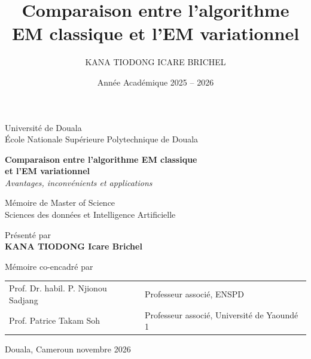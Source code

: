 \documentclass[12pt,a4paper,oneside]{report}
\title{Comparaison entre l'algorithme EM classique et l'EM variationnel}
\author{KANA TIODONG ICARE BRICHEL}
\date{Année Académique 2025 -- 2026}
\theoremstyle{plain}
\theoremstyle{definition}
\numberwithin{equation}{chapter}
\begin{document}
\addto\captionsfrench{%
  \renewcommand{\tablename}{Tableau}%
  \renewcommand{\figurename}{Figure}%
  \renewcommand{\contentsname}{Table des matières}%
  \renewcommand{\listtablename}{Liste des tableaux}%
  \renewcommand{\listfigurename}{Table des figures}%
  \renewcommand{\bibname}{Bibliographie}%
}
\captionsfrench

\begin{titlepage}
\begin{center}
{\Large Université de Douala}\\[4pt]
{\large École Nationale Supérieure Polytechnique de Douala}

\vspace{2.5cm}
{\LARGE\bfseries Comparaison entre l'algorithme EM classique\\[4pt] et l'EM variationnel}\\[10pt]
{\large\itshape Avantages, inconvénients et applications}

\vspace{2cm}
{\large Mémoire de Master of Science}\\[6pt]
{\large Sciences des données et Intelligence Artificielle}

\vspace{2cm}
Présenté par\\[6pt]
{\Large\bfseries KANA TIODONG Icare Brichel}

\vspace{1.8cm}
Mémoire co-encadré par\\[8pt]
\begin{tabular}{@{}ll@{}}
Prof. Dr. habil. P. Njionou Sadjang & Professeur associé, ENSPD \\
Prof. Patrice Takam Soh & Professeur associé, Université de Yaoundé 1 \\
\end{tabular}

\vfill
Douala, Cameroun \textbullet{} novembre 2026
\end{center}
\end{titlepage}



\clearpage

\tableofcontents
\clearpage
\renewcommand{\listfigurename}{Table des figures}
\listoffigures
\clearpage
\renewcommand{\listtablename}{Liste des tableaux}
\listoftables
\clearpage

\clearpage



\end{document}
